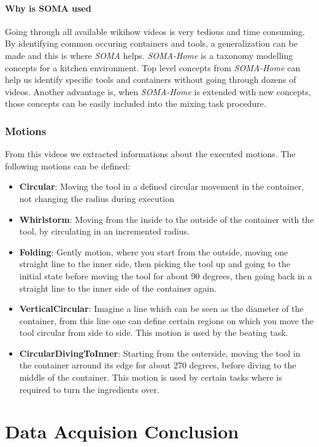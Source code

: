 \paragraph*{Why is SOMA used}
Going through all available wikihow videos is very tedious and time consuming. By identifying common occuring containers and tools, 
a generalization can be made and this is where \textit{SOMA} helps. \textit{SOMA-Home} is a taxonomy modelling concepts for a kitchen environment.
Top level concepts from \textit{SOMA-Home} can help us identify specific tools and containers without going through dozens of videos. 
Another advantage is, when \textit{SOMA-Home} is extended with new concepts, those concepts can be easily included into the mixing task procedure.   


\subsubsection*{Motions}
	From this videos we extracted informations about the executed motions. The following motions can be defined:
	\begin{itemize}
		\item \textbf{Circular}: Moving the tool in a defined circular movement in the container, not changing the radius during execution
		\item \textbf{Whirlstorm}: Moving from the inside to the outside of the container with the tool, by circulating in an incremented radius.
		\item \textbf{Folding}: Gently motion, where you start from the outside, moving one straight line to the inner side, then picking the tool up and going to the initial state before moving the tool for about 90 degrees, then going back in a straight line to the inner side of the container again.
		\item \textbf{VerticalCircular}: Imagine a line which can be seen as the diameter of the container, from this line one can define certain regions on which you move the tool circular from side to side. This motion is used by the beating task.
		\item \textbf{CircularDivingToInner}: Starting from the outerside, moving the tool in the container arround its edge for about 270 degrees, before diving to the middle of the container. This motion is used by certain tasks where is required to turn the ingredients over.
	\end{itemize}

\section*{Data Acquision Conclusion}

